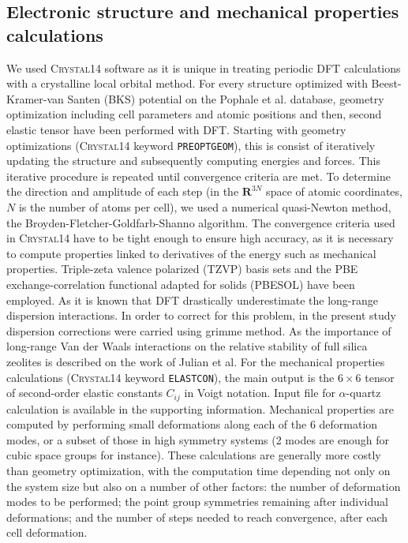 \documentclass[journal=jacsat,manuscript=article]{achemso}
\begin{document}
\subsection{Electronic structure and mechanical properties calculations}
We used \textsc{Crystal14} software as it is unique in treating periodic DFT calculations with a crystalline local orbital method. For every structure optimized with Beest-Kramer-van Santen (BKS) potential on the Pophale et al. \cite{vanBeest1990} database, geometry optimization including cell parameters and atomic positions and then, second elastic tensor have been performed with DFT. Starting with geometry optimizations (\textsc{Crystal14} keyword \texttt{PREOPTGEOM}), this is consist of iteratively updating the structure and subsequently computing energies and forces. This iterative procedure is repeated until convergence criteria are met. To determine the direction and amplitude of each step (in the $\mathbf{R}^{3N}$ space of atomic coordinates, $N$ is the number of atoms per cell), we used a numerical quasi-Newton method, the Broyden-Fletcher-Goldfarb-Shanno algorithm. The convergence criteria used in \textsc{Crystal14} have to be tight enough to ensure high accuracy, as it is necessary to compute properties linked to derivatives of the energy such as mechanical properties. Triple-zeta valence polarized (TZVP) basis sets and the PBE exchange-correlation functional adapted for solids (PBESOL) have been employed. As it is known that DFT drastically underestimate the long-range dispersion interactions. In order to correct for this problem, in the present study dispersion corrections were carried using grimme method. As the importance of long-range Van der Waals interactions on the relative stability of full silica zeolites is described on the work of Julian et al.\cite{Gale2003} For the mechanical properties calculations (\textsc{Crystal14} keyword \texttt{ELASTCON}), the main output is the $6\times6$ tensor of second-order elastic constants $C_{ij}$ in Voigt notation. Input file for $\alpha$-quartz calculation is available in the supporting information. Mechanical properties are computed by performing small deformations along each of the 6 deformation modes, or a subset of those in high symmetry systems (2 modes are enough for cubic space groups for instance). These calculations are generally more costly than geometry optimization, with the computation time depending not only on the system size but also on a number of other factors: the number of deformation modes to be performed; the point group symmetries remaining after individual deformations; and the number of steps needed to reach convergence, after each cell deformation.
\end{document}
